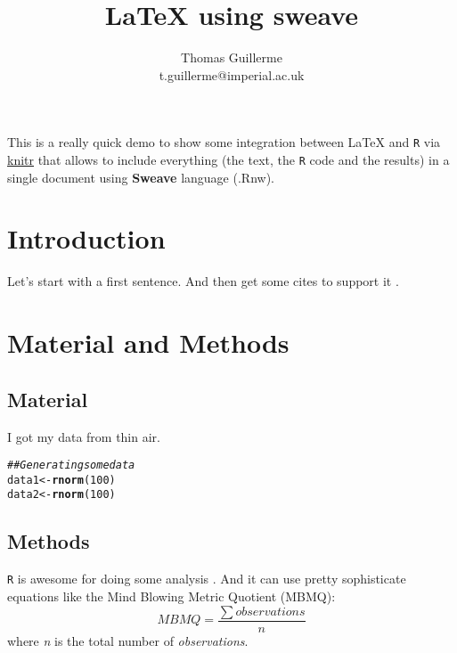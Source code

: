 \documentclass{article}\usepackage[]{graphicx}\usepackage[]{color}
\makeatletter
\newcommand{\hlnum}[1]{\textcolor[rgb]{0.686,0.059,0.569}{#1}}%
\newcommand{\hlcom}[1]{\textcolor[rgb]{0.678,0.584,0.686}{\textit{#1}}}%
\newcommand{\hlstd}[1]{\textcolor[rgb]{0.345,0.345,0.345}{#1}}%
\newcommand{\hlkwb}[1]{\textcolor[rgb]{0.69,0.353,0.396}{#1}}%
\newcommand{\hlkwd}[1]{\textcolor[rgb]{0.737,0.353,0.396}{\textbf{#1}}}%
\newenvironment{kframe}{%
 \def\at@end@of@kframe{}%
 \ifinner\ifhmode%
  \def\at@end@of@kframe{\end{minipage}}%
  \begin{minipage}{\columnwidth}%
 \fi\fi%
 \def\FrameCommand##1{\hskip\@totalleftmargin \hskip-\fboxsep
 \colorbox{shadecolor}{##1}\hskip-\fboxsep
     \hskip-\linewidth \hskip-\@totalleftmargin \hskip\columnwidth}%
 \MakeFramed {\advance\hsize-\width
   \@totalleftmargin\z@ \linewidth\hsize
   \@setminipage}}%
 {\par\unskip\endMakeFramed%
 \at@end@of@kframe}
\newenvironment{knitrout}{}{} %
\makeatother
\begin{document}


\title{LaTeX using sweave}

\author{Thomas Guillerme\\t.guillerme@imperial.ac.uk}


\maketitle

This is a really quick demo to show some integration between LaTeX and \texttt{R} via \href{http://yihui.name/knitr/}{knitr} that allows to include everything (the text, the \texttt{R} code and the results) in a single document using \textbf{Sweave} language (.Rnw).

\section{Introduction}

Let's start with a first sentence. And then get some cites to support it \cite{Cooper2008,Brazeau2011,harrisonamong-character2014}.

\section{Material and Methods}
\subsection{Material}
I got my data from thin air.

\begin{knitrout}
\color{fgcolor}\begin{kframe}
\begin{alltt}
\hlcom{## Generating some data}
\hlstd{data1} \hlkwb{<-} \hlkwd{rnorm}\hlstd{(}\hlnum{100}\hlstd{)}
\hlstd{data2} \hlkwb{<-} \hlkwd{rnorm}\hlstd{(}\hlnum{100}\hlstd{)}
\end{alltt}
\end{kframe}
\end{knitrout}

\subsection{Methods}
\label{methods}
\texttt{R} is awesome for doing some analysis \cite{R}.
And it can use pretty sophisticate equations like the Mind Blowing Metric Quotient (MBMQ):
  \begin{equation}
  \label{equation}
        MBMQ=\frac{\sum{observations}}{n}
  \end{equation}
where \textit{n} is the total number of \textit{observations}.
\end{document}
